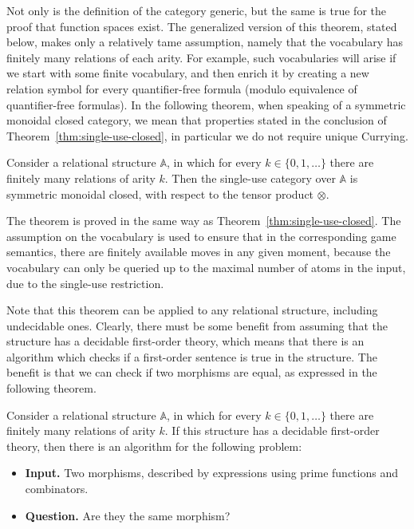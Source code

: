 \documentclass[10pt,a4paper]{amsart}
\numberwithin{equation}{section}
\theoremstyle{plain}
\newcommand{\set}[1]{\{#1\}}
\newcommand{\atoms}{\mathbb A}
\begin{document}
Not only is the definition of the category generic, but the same is true for  the proof that function spaces exist. The generalized version of this theorem, stated below, makes only a relatively tame assumption, namely that the vocabulary has finitely many relations of each arity. For example, such vocabularies will arise if we start with some finite vocabulary, and then enrich it by creating a new relation symbol for every quantifier-free formula (modulo equivalence of quantifier-free formulas). In the following theorem, when speaking of a symmetric monoidal closed category, we mean that properties stated in the conclusion of Theorem~\ref{thm:single-use-closed}, in particular we do not require unique Currying.



\begin{theorem}\label{thm:single-use-closed-relational-structures}
    Consider a relational structure $\atoms$, in which for every $k \in \set{0,1,\ldots}$ there are finitely many relations of arity $k$. Then the single-use category over $\atoms$ is symmetric monoidal closed, with respect to the tensor product $\otimes$.
\end{theorem}

The theorem is proved in the same way as Theorem~\ref{thm:single-use-closed}.  The assumption on the vocabulary is used to ensure that in the corresponding game semantics, there are finitely available moves in any given moment, because the vocabulary can only be queried up to the maximal number of atoms in the input, due to the single-use restriction.

Note that this  theorem can be applied to any relational structure, including undecidable ones. Clearly, there must be some benefit from assuming that the structure has a decidable first-order theory, which means that there is an algorithm which checks if a first-order sentence is true in the structure. 
The benefit is that we can check if two morphisms are equal, as expressed in the following theorem. 

\begin{theorem}\label{thm:first-order-decidable}
    Consider a relational structure $\atoms$, in which for every $k \in \set{0,1,\ldots}$ there are finitely many relations of arity $k$. If this structure has a decidable first-order theory, then there is an algorithm for the following problem:
    \begin{itemize}
        \item {\bf Input.} Two morphisms, described by expressions using prime functions and combinators.
        \item {\bf Question.} Are they the same morphism?
    \end{itemize}
\end{theorem}
\end{document}
